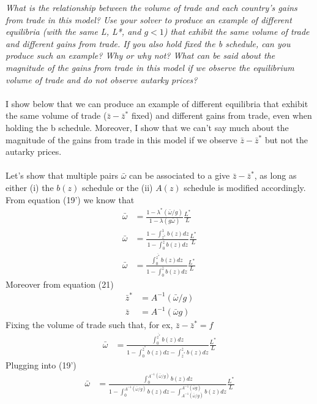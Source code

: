 \documentclass[10pt, final]{article}
\begin{document}
\textit{What is the relationship between the volume of trade and each country's gains from trade in this model? Use your solver to produce an example of different equilibria (with the same L, L*, and $g<1$) that exhibit the same volume of trade and different gains from trade. If you also hold fixed the b schedule, can you produce such an example? Why or why not? What can be said about the magnitude of the gains from trade in this model if we observe the equilibrium volume of trade and do not observe autarky prices?}
\\
\\
I show below that we can produce an example of different equilibria that exhibit the same volume of trade ($\bar{z} - \bar{z}^*$ fixed) and different gains from trade, even when holding the b schedule. Moreover, I show that we can't say much about the magnitude of the gains from trade in this model if we observe $\bar{z} - \bar{z}^*$ but not the autarky prices.
\\
\\
Let's show that multiple pairs $\bar{\omega}$ can be associated to a give $\bar{z} - \bar{z}^*$, as long as either (i) the $b(z)$ schedule or the (ii) $A(z)$ schedule is modified accordingly.
\\
From equation (19') we know that
\begin{align*}
	\bar{\omega} &= \frac{1 - \lambda^*(\bar{\omega} / g)}{1 - \lambda(g \bar{\omega})} \frac{L^*}{L} \\
	\bar{\omega} &= \frac{1 - \int_{\bar{z^*}}^1 b(z) dz}{1 - \int_0^{\bar{z}} b(z) dz} \frac{L^*}{L} \\
	\bar{\omega} &= \frac{\int_0^{\bar{z^*}} b(z) dz}{1 - \int_0^{\bar{z}} b(z) dz} \frac{L^*}{L}
\end{align*}
Moreover from equation (21)
\begin{align*}
	\bar{z}^* &= A^{-1}(\bar{\omega} / g) \\
	\bar{z} &= A^{-1}(\bar{\omega} g)
\end{align*}
Fixing the volume of trade such that, for ex, $\bar{z} - \bar{z}^* = f$
\begin{align*}
	\bar{\omega} &= \frac{\int_0^{\bar{z^*}} b(z) dz}{1 - \int_0^{\bar{z}^*} b(z) dz - \int_{\bar{z}^*}^{\bar{z}} b(z) dz} \frac{L^*}{L}
\end{align*}
Plugging into (19')
\begin{align*}
	\bar{\omega} &= \frac{\int_0^{A^{-1}(\bar{\omega} / g)} b(z) dz}{1 - \int_0^{A^{-1}(\bar{\omega} / g)} b(z) dz - \int_{A^{-1}(\bar{\omega} / g)}^{A^{-1}(\bar{\omega} g)} b(z) dz} \frac{L^*}{L}
\end{align*}
\end{document}
